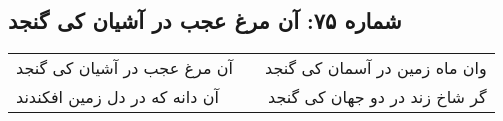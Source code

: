 \begin{center}
\section*{شماره ۷۵: آن مرغ عجب در آشیان کی گنجد}
\label{sec:075}
\begin{longtable}{l p{0.5cm} r}
آن مرغ عجب در آشیان کی گنجد
&&
وان ماه زمین در آسمان کی گنجد
\\
آن دانه که در دل زمین افکندند
&&
گر شاخ زند در دو جهان کی گنجد
\\
\end{longtable}
\end{center}
